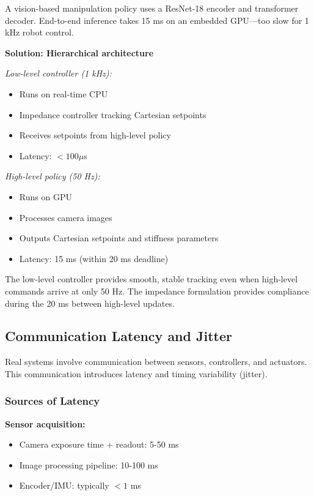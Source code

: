 \begin{example}
\label{ex:hierarchical_control}
A vision-based manipulation policy uses a ResNet-18 encoder and transformer decoder. End-to-end inference takes 15 ms on an embedded GPU---too slow for 1 kHz robot control.

\textbf{Solution: Hierarchical architecture}

\textit{Low-level controller (1 kHz):}
\begin{itemize}
    \item Runs on real-time CPU
    \item Impedance controller tracking Cartesian setpoints
    \item Receives setpoints from high-level policy
    \item Latency: $< 100 \mu$s
\end{itemize}

\textit{High-level policy (50 Hz):}
\begin{itemize}
    \item Runs on GPU
    \item Processes camera images
    \item Outputs Cartesian setpoints and stiffness parameters
    \item Latency: 15 ms (within 20 ms deadline)
\end{itemize}

The low-level controller provides smooth, stable tracking even when high-level commands arrive at only 50 Hz. The impedance formulation provides compliance during the 20 ms between high-level updates.
\end{example}

\subsection{Communication Latency and Jitter}

Real systems involve communication between sensors, controllers, and actuators. This communication introduces latency and timing variability (jitter).

\subsubsection{Sources of Latency}

\textbf{Sensor acquisition:}
\begin{itemize}
    \item Camera exposure time + readout: 5-50 ms
    \item Image processing pipeline: 10-100 ms
    \item Encoder/IMU: typically $< 1$ ms
\end{itemize}

